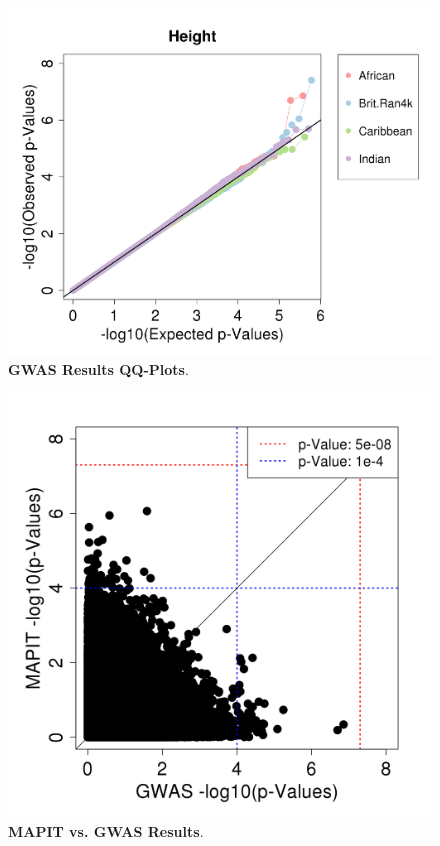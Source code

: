 \documentclass[12pt,a4paper]{article}
\begin{document}
\begin{figure}[htbp]
\centering
\includegraphics[scale=.35]{Images/Main/InterPath_Main_Figure_GWAS_vs2_Height.png}
\caption[TBD]{\textbf{GWAS Results QQ-Plots}.}
\label{InterPath-Main-Figure-GWAS-Height}
\end{figure}

\begin{figure}[htbp]
\centering
\includegraphics[scale=.35]{Images/Main/InterPath_Main_Figure_MAPITvsGWAS_vs2_AfrHght.png}
\caption[TBD]{\textbf{MAPIT vs. GWAS Results}.}
\label{InterPath-Main-Figure-MAPITvsGWAS-AfrHght}
\end{figure}
\end{document}

